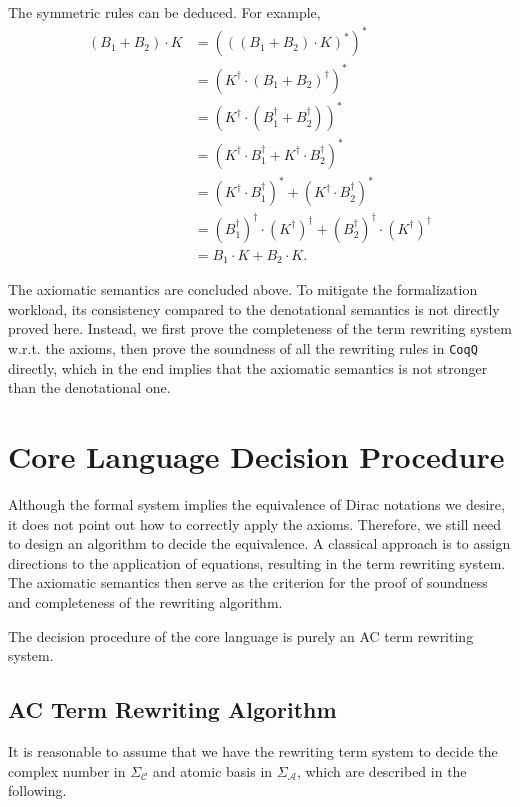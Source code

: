 \documentclass[manuscript, review, timestamp]{acmart}
\begin{document}
The symmetric rules can be deduced. For example,
\begin{align*}
(B_1 + B_2) \cdot K & = (((B_1 + B_2) \cdot K)^*)^* \\
& = (K^\dagger \cdot (B_1 + B_2)^\dagger)^* \\
& = (K^\dagger \cdot (B_1^\dagger + B_2^\dagger))^* \\
& = (K^\dagger \cdot B_1^\dagger + K^\dagger \cdot B_2^\dagger)^* \\
& = (K^\dagger \cdot B_1^\dagger)^* + (K^\dagger \cdot B_2^\dagger)^* \\
& = (B_1^\dagger)^\dagger \cdot (K^\dagger)^\dagger + (B_2^\dagger)^\dagger \cdot (K^\dagger)^\dagger \\
& = B_1 \cdot K + B_2 \cdot K.
\end{align*}

The axiomatic semantics are concluded above. To mitigate the formalization workload, its consistency compared to the denotational semantics is not directly proved here. Instead, we first prove the completeness of the term rewriting system w.r.t. the axioms, then prove the soundness of all the rewriting rules in \texttt{CoqQ} directly, which in the end implies that the axiomatic semantics is not stronger than the denotational one.


\section{Core Language Decision Procedure}
\label{sec: typed_dirac_rules}

Although the formal system implies the equivalence of Dirac notations we desire, it does not point out how to correctly apply the axioms. Therefore, we still need to design an algorithm to decide the equivalence. A classical approach is to assign directions to the application of equations, resulting in the term rewriting system.
The axiomatic semantics then serve as the criterion for the proof of soundness and completeness of the rewriting algorithm.

The decision procedure of the core language is purely an AC term rewriting system.

\subsection{AC Term Rewriting Algorithm}
It is reasonable to assume that we have the rewriting term system to decide the complex number in $\Sigma_\mathcal{C}$ and atomic basis in $\Sigma_\mathcal{A}$, which are described in the following.
\end{document}
